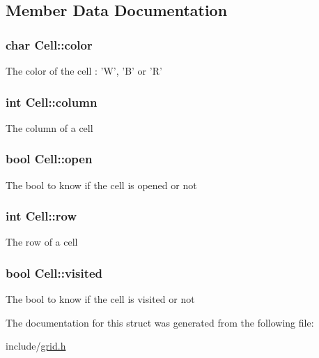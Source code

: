 \subsection{Member Data Documentation}
\hypertarget{structCell_ad53d9424dcb05dceaa0433b5fceecbed}{
\subsubsection[{color}]{\setlength{\rightskip}{0pt plus 5cm}char Cell\-::color}}\label{structCell_ad53d9424dcb05dceaa0433b5fceecbed}
The color of the cell \-: 'W', 'B' or 'R' \hypertarget{structCell_a6aae9428106f7cd7574660e3c2278ee0}{
\subsubsection[{column}]{\setlength{\rightskip}{0pt plus 5cm}int Cell\-::column}}\label{structCell_a6aae9428106f7cd7574660e3c2278ee0}
The column of a cell \hypertarget{structCell_a415f03ff30c2bc8c170ee592beb1ef26}{
\subsubsection[{open}]{\setlength{\rightskip}{0pt plus 5cm}bool Cell\-::open}}\label{structCell_a415f03ff30c2bc8c170ee592beb1ef26}
The bool to know if the cell is opened or not \hypertarget{structCell_a85d2a7af6195f5196574790fbc1becfd}{
\subsubsection[{row}]{\setlength{\rightskip}{0pt plus 5cm}int Cell\-::row}}\label{structCell_a85d2a7af6195f5196574790fbc1becfd}
The row of a cell \hypertarget{structCell_ac0fdf52adc7d9dd8c5de95635ff04de3}{
\subsubsection[{visited}]{\setlength{\rightskip}{0pt plus 5cm}bool Cell\-::visited}}\label{structCell_ac0fdf52adc7d9dd8c5de95635ff04de3}
The bool to know if the cell is visited or not 

The documentation for this struct was generated from the following file\-:\begin{DoxyCompactItemize}
\item 
include/\hyperlink{grid_8h}{grid.\-h}\end{DoxyCompactItemize}
